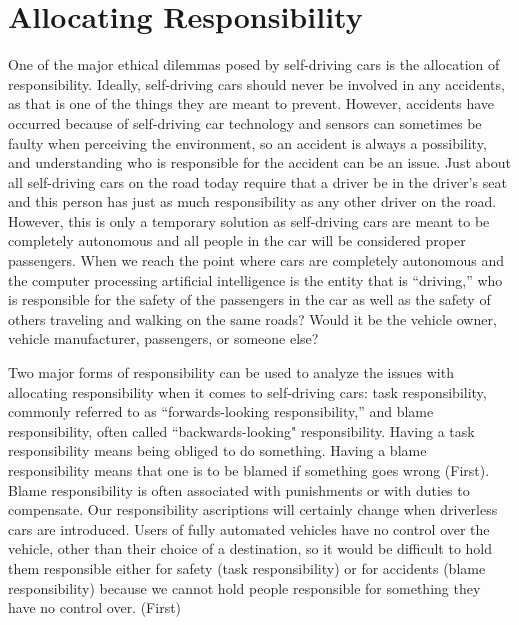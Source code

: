 \documentclass[10pt,twocolumn]{article}
\begin{document}
\section{Allocating Responsibility}
One of the major ethical dilemmas posed by self-driving cars is the allocation of responsibility. Ideally, self-driving cars should never be involved in any accidents, as that is one of the things they are meant to prevent. However, accidents have occurred because of self-driving car technology and sensors can sometimes be faulty when perceiving the environment, so an accident is always a possibility, and understanding who is responsible for the accident can be an issue. Just about all self-driving cars on the road today require that a driver be in the driver’s seat and this person has just as much responsibility as any other driver on the road. However, this is only a temporary solution as self-driving cars are meant to be completely autonomous and all people in the car will be considered proper passengers. When we reach the point where cars are completely autonomous and the computer processing artificial intelligence is the entity that is “driving,” who is responsible for the safety of the passengers in the car as well as the safety of others traveling and walking on the same roads? Would it be the vehicle owner, vehicle manufacturer, passengers, or someone else?

Two major forms of responsibility can be used to analyze the issues with allocating responsibility when it comes to self-driving cars: task responsibility, commonly referred to as “forwards-looking responsibility,” and blame responsibility, often called “backwards-looking" responsibility. Having a task responsibility means being obliged to do something. Having a blame responsibility means that one is to be blamed if something goes wrong (First). Blame responsibility is often associated with punishments or with duties to compensate. Our responsibility ascriptions will certainly change when driverless cars are introduced. Users of fully automated vehicles have no control over the vehicle, other than their choice of a destination, so it would be difficult to hold them responsible either for safety (task responsibility) or for accidents (blame responsibility) because we cannot hold people responsible for something they have no control over. (First)
\end{document}
